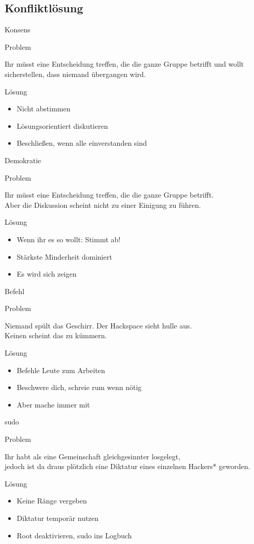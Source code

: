 \documentclass[aspectratio=43]{beamer}
\newcommand{\pattern}[2]{
  \begin{alertblock}{Problem}
    #1
  \end{alertblock}
  \pause
  \begin{exampleblock}{Lösung}
    #2
  \end{exampleblock}
}
\begin{document}
  \subsection{Konfliktlösung}

  \begin{frame}{Konsens}
    \pattern{
      Ihr müsst eine Entscheidung treffen, die die ganze Gruppe betrifft und
      wollt sicherstellen, dass niemand übergangen wird.
    }{
      \begin{itemize}
        \item{Nicht abstimmen}
        \pause
        \item{Lösungsorientiert diskutieren}
        \pause
        \item{Beschließen, wenn alle einverstanden sind}
      \end{itemize}
    }
  \end{frame}

  \begin{frame}{Demokratie}
    \pattern{
      Ihr müsst eine Entscheidung treffen, die die ganze Gruppe betrifft.\\
      Aber die Diskussion scheint nicht zu einer Einigung zu führen.
    }{
      \begin{itemize}
        \item{Wenn ihr es so wollt: Stimmt ab!}
        \pause
        \item{Stärkste Minderheit dominiert}
        \pause
        \item{Es wird sich zeigen}
      \end{itemize}
    }
  \end{frame}

  \begin{frame}{Befehl}
    \pattern{
      Niemand spült das Geschirr. Der Hackspace sieht hulle aus.\\
      Keinen scheint das zu kümmern.
    }{
      \begin{itemize}
        \item{Befehle Leute zum Arbeiten}
        \pause
        \item{Beschwere dich, schreie rum wenn nötig}
        \pause
        \item{Aber mache immer mit}
      \end{itemize}
    }
  \end{frame}

  \begin{frame}{sudo}
    \pattern{
      Ihr habt als eine Gemeinschaft gleichgesinnter losgelegt,\\
      jedoch ist da draus plötzlich eine Diktatur eines einzelnen Hackers* geworden.
    }{
      \begin{itemize}
        \item{Keine Ränge vergeben}
        \pause
        \item{Diktatur temporär nutzen}
        \pause
        \item{Root deaktivieren, sudo ins Logbuch}
      \end{itemize}
    }
  \end{frame}
\end{document}
